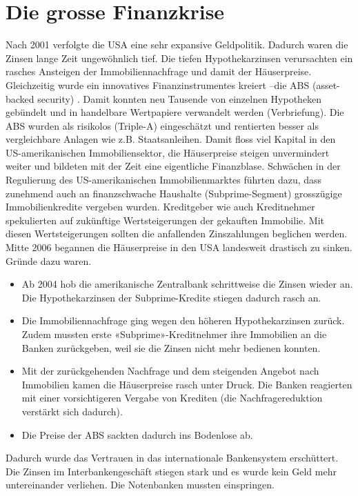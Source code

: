 \section{Die grosse Finanzkrise}
Nach 2001 verfolgte die USA eine sehr expansive Geldpolitik. Dadurch waren die Zinsen lange Zeit ungewöhnlich tief. Die tiefen Hypothekarzinsen verursachten ein rasches Ansteigen der Immobiliennachfrage und damit der Häuserpreise.
Gleichzeitig wurde ein innovatives Finanzinstrumentes kreiert –die ABS (asset-backed security) . Damit konnten neu Tausende von einzelnen Hypotheken gebündelt und in handelbare Wertpapiere verwandelt werden (Verbriefung). Die ABS wurden als risikolos (Triple-A) eingeschätzt und rentierten besser als vergleichbare Anlagen wie z.B. Staatsanleihen.
Damit floss viel Kapital in den US-amerikanischen Immobiliensektor, die Häuserpreise steigen unvermindert weiter und bildeten mit der Zeit eine eigentliche Finanzblase.
Schwächen in der Regulierung des US-amerikanischen Immobilienmarktes führten dazu, dass zunehmend auch an finanzschwache Haushalte (Subprime-Segment) grosszügige Immobilienkredite vergeben wurden.
Kreditgeber wie auch Kreditnehmer spekulierten auf zukünftige Wertsteigerungen der gekauften Immobilie. Mit diesen Wertsteigerungen sollten die anfallenden Zinszahlungen beglichen werden.\\
Mitte 2006 begannen die Häuserpreise in den USA landesweit drastisch zu sinken. Gründe dazu waren. 
\begin{itemize}
	\item Ab 2004 hob die amerikanische Zentralbank schrittweise die Zinsen wieder an. Die Hypothekarzinsen der Subprime-Kredite stiegen dadurch rasch an.
	\item Die Immobiliennachfrage ging wegen den höheren Hypothekarzinsen zurück. Zudem mussten erste «Subprime»-Kreditnehmer ihre Immobilien an die Banken zurückgeben, weil sie die Zinsen nicht mehr bedienen konnten.
	\item Mit der zurückgehenden Nachfrage und dem steigenden Angebot nach Immobilien kamen die Häuserpreise rasch unter Druck. Die Banken reagierten mit einer vorsichtigeren Vergabe von Krediten (die Nachfragereduktion verstärkt sich dadurch).
	\item Die Preise der ABS sackten dadurch ins Bodenlose ab.
\end{itemize}
Dadurch wurde das Vertrauen in das internationale Bankensystem erschüttert. Die Zinsen im Interbankengeschäft stiegen stark und es wurde kein Geld mehr untereinander verliehen. Die Notenbanken mussten einspringen. 